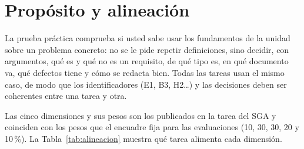 \documentclass[11pt]{article}
\newcommand{\seccion}[1]{\section{\textcolor{utegreendk}{#1}}}
\begin{document}

\seccion{Propósito y alineación}




La prueba práctica comprueba si usted sabe usar los fundamentos de la unidad sobre un problema concreto: no se le pide repetir definiciones, sino decidir, con argumentos, qué es y qué no es un requisito, de qué tipo es, en qué documento va, qué defectos tiene y cómo se redacta bien. Todas las tareas usan el mismo caso, de modo que los identificadores (E1, B3, H2\ldots) y las decisiones deben ser coherentes entre una tarea y otra.



Las cinco dimensiones y sus pesos son los publicados en la tarea del SGA y coinciden con los pesos que el encuadre fija para las evaluaciones (10, 30, 30, 20 y 10\,\%). La Tabla~\ref{tab:alineacion} muestra qué tarea alimenta cada dimensión.
\end{document}
